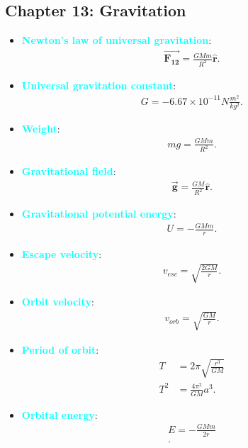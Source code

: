 \documentclass{report}
\begin{document}
    \pagebreak 
    \subsection{Chapter 13: Gravitation}
    \begin{itemize}
        \item \textbf{\textcolor{cyan}{Newton's law of universal gravitation}}:
            \begin{align*}
                \vec{\mathbf{F_{12}}} = \frac{GMm}{R^{2}}\hat{\mathbf{r}}
            .\end{align*}
        \item \textbf{\textcolor{cyan}{Universal gravitation constant}}:
            \begin{align*}
               G = -6.67 \times 10^{-11} N \frac{m^{2}}{kg^{2}} 
            .\end{align*}
        \item \textbf{\textcolor{cyan}{Weight}}:
            \begin{align*}
                mg = \frac{GMm}{R^{2}}
            .\end{align*}
        \item \textbf{\textcolor{cyan}{Gravitational field}}:
            \begin{align*}
                \vec{\mathbf{g}} = \frac{GM}{R^{2}}\hat{\mathbf{r}}
            .\end{align*}
        \item \textbf{\textcolor{cyan}{Gravitational potential energy}}:
            \begin{align*}
                U = -\frac{GMm}{r}
            .\end{align*}
        \item \textbf{\textcolor{cyan}{Escape velocity}}:
            \begin{align*}
                v_{esc} = \sqrt{\frac{2GM}{r}}
            .\end{align*}
        \item \textbf{\textcolor{cyan}{Orbit velocity}}:
            \begin{align*}
                v_{orb} = \sqrt{\frac{GM}{r}}
            .\end{align*}
        \item \textbf{\textcolor{cyan}{Period of orbit}}:
            \begin{align*}
                T &= 2\pi\sqrt{\frac{r^{3}}{GM}} \\
                T^{2} &=\frac{4\pi^{2}}{GM}a^{3} 
            .\end{align*}
        \item \textbf{\textcolor{cyan}{Orbital energy}}:
            \begin{align*}
                E = -\frac{GMm}{2r} \\
            .\end{align*}

    \end{itemize}
\end{document}
